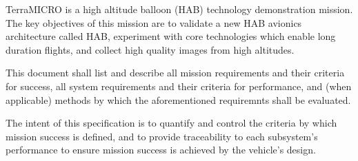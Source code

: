 TerraMICRO is a high altitude balloon (HAB) technology demonstration mission.
The key objectives of this mission are to validate a new HAB avionics 
architecture called HAB, experiment with core technologies which enable 
long duration flights, and collect high quality images from high altitudes.
    
This document shall list and describe all mission requirements and their 
criteria for success, all system requirements and their criteria for 
performance, and (when applicable) methods by which the aforementioned 
requiremnts shall be evaluated.

The intent of this specification is to quantify and control the criteria
by which mission success is defined, and to provide traceability to each
subsystem's performance to ensure mission success is achieved by the 
vehicle's design.